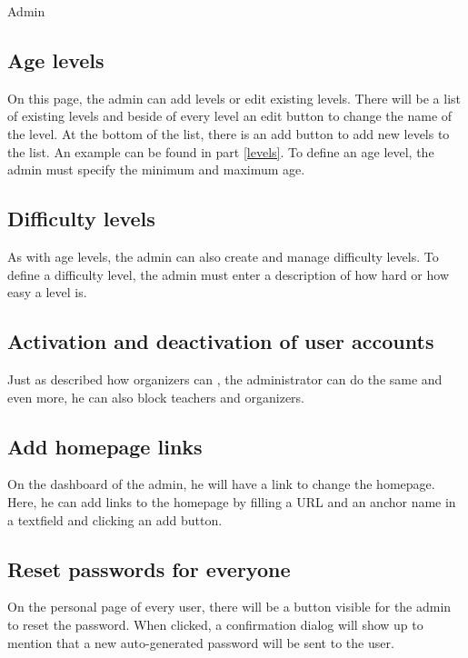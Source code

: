 \begin{section}{Admin}
\subsection{Age levels}
On this page, the admin can add levels or edit existing levels. There will be a list of existing levels and beside of every level an edit button to change the name of the level. At the bottom of the list, there is an add button to add new levels to the list. An example can be found in part \ref{levels}. To define an age level, the admin must specify the minimum and maximum age. 

\subsection{Difficulty levels}
As with age levels, the admin can also create and manage difficulty levels. To define a difficulty level, the admin must enter a description of how hard or how easy a level is.

\subsection{Activation and deactivation of user accounts}
Just as described how organizers can , the administrator can do the same and even more, he can also block teachers and organizers.

\subsection{Add homepage links}
On the dashboard of the admin, he will have a link to change the homepage. Here, he can add links to the homepage by filling a URL and an anchor name in a textfield and clicking an add button. 

\subsection{Reset passwords for everyone}
On the personal page of every user, there will be a button visible for the admin to reset the password. When clicked, a confirmation dialog will show up to mention that a new auto-generated password will be sent to the user.

\end{section}
